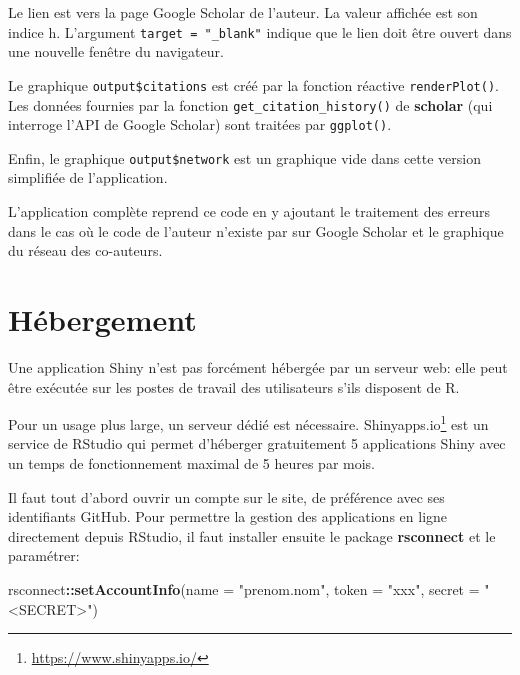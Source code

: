 \documentclass[
  12pt,
  french,
  a4paper,
  extrafontsizes,onecolumn,openright
  ]{memoir}
\newenvironment{Shaded}{\begin{snugshade}}{\end{snugshade}}
\newcommand{\DataTypeTok}[1]{\textcolor[rgb]{0.13,0.29,0.53}{#1}}
\newcommand{\KeywordTok}[1]{\textcolor[rgb]{0.13,0.29,0.53}{\textbf{#1}}}
\newcommand{\NormalTok}[1]{#1}
\newcommand{\OperatorTok}[1]{\textcolor[rgb]{0.81,0.36,0.00}{\textbf{#1}}}
\newcommand{\StringTok}[1]{\textcolor[rgb]{0.31,0.60,0.02}{#1}}
\begin{document}
\normalsize

Le lien est vers la page Google Scholar de l'auteur.
La valeur affichée est son indice h.
L'argument \texttt{target\ =\ "\_blank"} indique que le lien doit être ouvert dans une nouvelle fenêtre du navigateur.

Le graphique \texttt{output\$citations} est créé par la fonction réactive \texttt{renderPlot()}.
Les données fournies par la fonction \texttt{get\_citation\_history()} de \textbf{scholar} (qui interroge l'API de Google Scholar) sont traitées par \texttt{ggplot()}.

Enfin, le graphique \texttt{output\$network} est un graphique vide dans cette version simplifiée de l'application.

L'application complète reprend ce code en y ajoutant le traitement des erreurs dans le cas où le code de l'auteur n'existe par sur Google Scholar et le graphique du réseau des co-auteurs.

\hypertarget{sec:hebergement-shiny}{%
\section{Hébergement}\label{sec:hebergement-shiny}}

Une application Shiny n'est pas forcément hébergée par un serveur web: elle peut être exécutée sur les postes de travail des utilisateurs s'ils disposent de R.

Pour un usage plus large, un serveur dédié est nécessaire.
Shinyapps.io\footnote{\url{https://www.shinyapps.io/}} est un service de RStudio qui permet d'héberger gratuitement 5 applications Shiny avec un temps de fonctionnement maximal de 5 heures par mois.

Il faut tout d'abord ouvrir un compte sur le site, de préférence avec ses identifiants GitHub.
Pour permettre la gestion des applications en ligne directement depuis RStudio, il faut installer ensuite le package \textbf{rsconnect} et le paramétrer:

\scriptsize

\begin{Shaded}
\begin{Highlighting}[]
\NormalTok{rsconnect}\OperatorTok{::}\KeywordTok{setAccountInfo}\NormalTok{(}\DataTypeTok{name =} \StringTok{"prenom.nom"}\NormalTok{, }\DataTypeTok{token =} \StringTok{"xxx"}\NormalTok{, }
    \DataTypeTok{secret =} \StringTok{"<SECRET>"}\NormalTok{)}
\end{Highlighting}
\end{Shaded}
\end{document}
